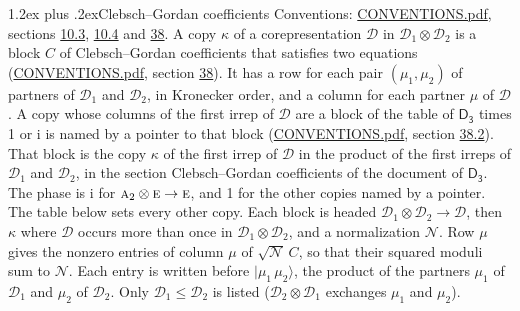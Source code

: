 \documentclass[10pt,a4paper]{article}
\makeatletter
\renewcommand\section{\@startsection{section}{1}{\z@}{-3ex plus -1ex minus -.2ex}%
  {1.2ex plus .2ex}{\normalfont\large\sffamily\bfseries\color{parttitle}}}
\numberwithin{equation}{section}
\newcommand{\grp}[1]{\mathsf{#1}}
\newcommand{\irr}[1]{\text{\normalfont\scshape #1}}
\newcommand{\iunit}{\mathrm{i}}
\newcommand{\irrprod}{\otimes}
\newcommand{\mult}{\kappa}
\newcommand{\intx}{\mu}
\newcommand{\cgnorm}{\mathcal{N}}
\newcommand{\prodket}[2]{\lvert {#1}\,{#2}\rangle}
\makeatother
\begin{document}
\section{Clebsch--Gordan coefficients}\label{s:clebsch_gordan}
Conventions: \href{../../CONVENTIONS.pdf}{CONVENTIONS.pdf}, sections \href{../../../rotation/CONVENTIONS.pdf\#conv.10.3}{10.3}, \href{../../../rotation/CONVENTIONS.pdf\#conv.10.4}{10.4} and \href{../../CONVENTIONS.pdf\#conv.38}{38}.
\leavevmode\label{n:index.copy}\label{n:matrix.cg.stored}A copy $\mult$ of a corepresentation $\mathcal{D}$ in $\mathcal{D}_1\irrprod\mathcal{D}_2$ is a block $C$ of Clebsch--Gordan coefficients that satisfies two equations (\href{../../CONVENTIONS.pdf}{CONVENTIONS.pdf}, section \href{../../CONVENTIONS.pdf\#conv.38}{38}). \label{n:index.cg}It has a row for each pair $(\intx_1, \intx_2)$ of partners of $\mathcal{D}_1$ and $\mathcal{D}_2$, in Kronecker order, and a column for each partner $\intx$ of $\mathcal{D}$.
A copy whose columns of the first irrep of $\mathcal{D}$ are a block of the table of $\grp{D_{3}}$ times 1 or $\iunit$ is named by a pointer to that block (\href{../../CONVENTIONS.pdf}{CONVENTIONS.pdf}, section \href{../../CONVENTIONS.pdf\#conv.38.2}{38.2}). That block is the copy $\mult$ of the first irrep of $\mathcal{D}$ in the product of the first irreps of $\mathcal{D}_1$ and $\mathcal{D}_2$, in the section Clebsch--Gordan coefficients of the document of \href{../../../rotation/data/pdf/D3.pdf}{$\grp{D_{3}}$}. The phase is $\iunit$ for $\irr{a}_{2}\irrprod \irr{e}\to \irr{e}$, and 1 for the other copies named by a pointer. The table below sets every other copy.
Each block is headed $\mathcal{D}_1\irrprod\mathcal{D}_2\to\mathcal{D}$, then $\mult$ where $\mathcal{D}$ occurs more than once in $\mathcal{D}_1\irrprod\mathcal{D}_2$, and a normalization $\cgnorm$. Row $\intx$ gives the nonzero entries of column $\intx$ of $\sqrt{\cgnorm}\,C$, so that their squared moduli sum to $\cgnorm$. \label{n:vector.ket.product}Each entry is written before $\prodket{\intx_1}{\intx_2}$, the product of the partners $\intx_1$ of $\mathcal{D}_1$ and $\intx_2$ of $\mathcal{D}_2$. Only $\mathcal{D}_1 \le \mathcal{D}_2$ is listed ($\mathcal{D}_2\irrprod\mathcal{D}_1$ exchanges $\intx_1$ and $\intx_2$).
\end{document}
